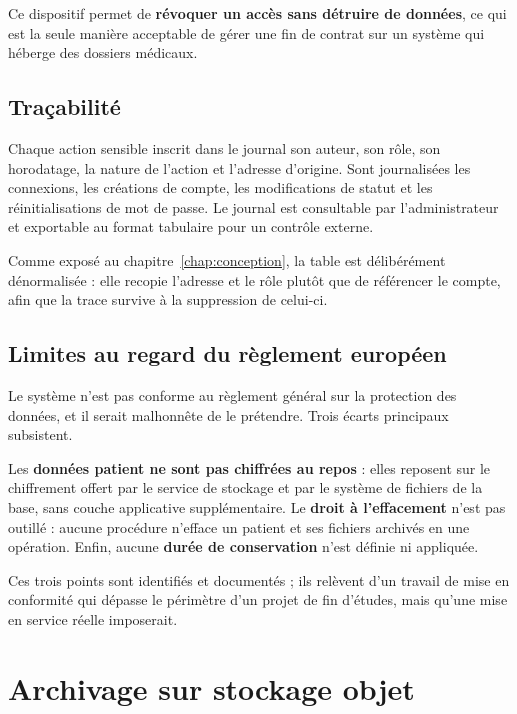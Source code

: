 Ce dispositif permet de \textbf{révoquer un accès sans détruire de données}, ce qui est
la seule manière acceptable de gérer une fin de contrat sur un système qui héberge des
dossiers médicaux.

\subsection{Traçabilité}

Chaque action sensible inscrit dans le journal son auteur, son rôle, son horodatage,
la nature de l'action et l'adresse d'origine. Sont journalisées les connexions, les
créations de compte, les modifications de statut et les réinitialisations de mot de
passe. Le journal est consultable par l'administrateur et exportable au format
tabulaire pour un contrôle externe.

Comme exposé au chapitre~\ref{chap:conception}, la table est délibérément dénormalisée :
elle recopie l'adresse et le rôle plutôt que de référencer le compte, afin que la trace
survive à la suppression de celui-ci.


\subsection{Limites au regard du règlement européen}

Le système n'est pas conforme au règlement général sur la protection des données, et il
serait malhonnête de le prétendre. Trois écarts principaux subsistent.

Les \textbf{données patient ne sont pas chiffrées au repos} : elles reposent sur le
chiffrement offert par le service de stockage et par le système de fichiers de la base,
sans couche applicative supplémentaire. Le \textbf{droit à l'effacement} n'est pas
outillé : aucune procédure n'efface un patient et ses fichiers archivés en une
opération. Enfin, aucune \textbf{durée de conservation} n'est définie ni appliquée.

Ces trois points sont identifiés et documentés ; ils relèvent d'un travail de mise en
conformité qui dépasse le périmètre d'un projet de fin d'études, mais qu'une mise en
service réelle imposerait.

\section{Archivage sur stockage objet}

